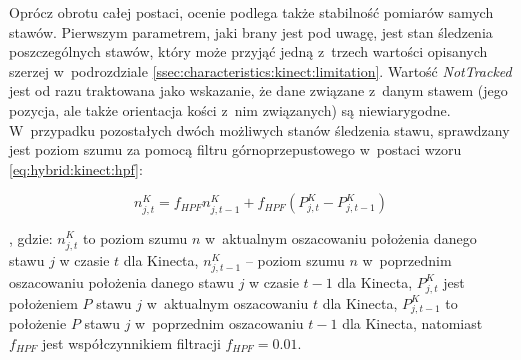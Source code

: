 Oprócz obrotu całej postaci, ocenie podlega także stabilność pomiarów samych stawów. Pierwszym parametrem, jaki brany jest pod uwagę, jest stan śledzenia poszczególnych stawów, który może przyjąć jedną z~trzech wartości opisanych szerzej w~podrozdziale \ref{ssec:characteristics:kinect:limitation}. Wartość \emph{NotTracked} jest od razu traktowana jako wskazanie, że dane związane z~danym stawem (jego pozycja, ale także orientacja kości z~nim związanych) są niewiarygodne. W~przypadku pozostałych dwóch możliwych stanów śledzenia stawu, sprawdzany jest poziom szumu za pomocą filtru górnoprzepustowego w~postaci wzoru \ref{eq:hybrid:kinect:hpf}: 
														
\begin{equation}
	n^K_{j,t} = f_{HPF} n^K_{j,t-1} + f_{HPF} (P^K_{j,t} - P^K_{j,t-1}) 
	\label{eq:hybrid:kinect:hpf}
\end{equation}
														
, gdzie: $n^K_{j,t}$ to poziom szumu $n$ w~aktualnym oszacowaniu położenia danego stawu $j$ w czasie $t$ dla Kinecta, $n^K_{j,t-1}$ -- poziom szumu $n$ w~poprzednim oszacowaniu położenia danego stawu $j$ w czasie $t-1$ dla Kinecta,	$P^K_{j,t}$ jest położeniem $P$ stawu $j$ w~aktualnym oszacowaniu $t$ dla Kinecta, $P^K_{j,t-1}$ to położenie  $P$ stawu $j$ w~poprzednim oszacowaniu $t-1$ dla Kinecta, natomiast $f_{HPF}$ jest współczynnikiem filtracji  $f_{HPF} = 0.01$. 
												

